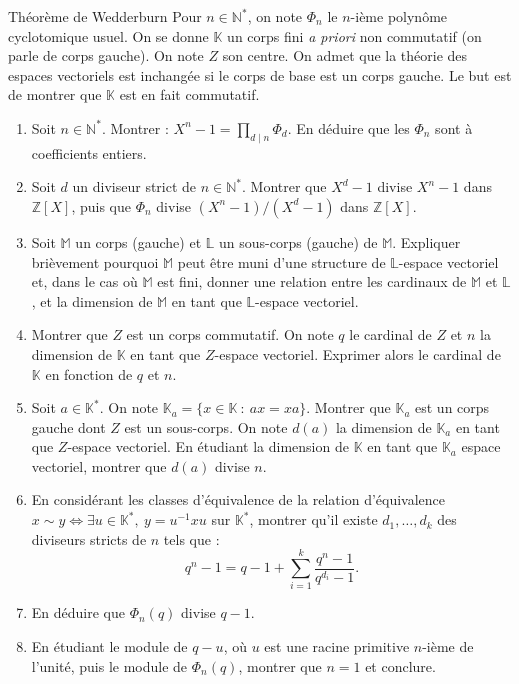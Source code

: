 \documentclass[french]{book}
\newcommand{\N}{\mathbb{N}}
\newcommand{\Z}{\mathbb{Z}}
\newcommand{\K}{\mathbb{K}}
\renewcommand{\L}{\mathbb{L}}
\newcommand{\st}{^*}
\newcommand{\inv}{^{-1}}
\theoremstyle{definition}
\theoremstyle{remark}
\begin{document}
\begin{exo}[3]{Théorème de Wedderburn}
	Pour $n\in\N\st$, on note $\Phi_n$ le $n$-ième polynôme cyclotomique usuel. On se donne $\K$ un corps fini \textit{a priori} non commutatif (on parle de corps gauche). On note $Z$ son centre. On admet que la théorie des espaces vectoriels est inchangée si le corps de base est un corps gauche. Le but est de montrer que $\K$ est en fait commutatif.
	\begin{enumerate}
		\item Soit $n\in\N\st$. Montrer : $X^n-1=\displaystyle\prod_{d\mid n}\Phi_d$. En déduire que les $\Phi_n$ sont à coefficients entiers.
		\item Soit $d$ un diviseur strict de $n\in\N\st$. Montrer que $X^d-1$ divise $X^n-1$ dans $\Z[X]$, puis que $\Phi_n$ divise $(X^n-1)/(X^d-1)$ dans $\Z[X]$.
		\item Soit $\mathbb{M}$ un corps (gauche) et $\L$ un sous-corps (gauche) de $\mathbb{M}$. Expliquer brièvement pourquoi $\mathbb{M}$ peut être muni d'une structure de $\L$-espace vectoriel et, dans le cas où $\mathbb{M}$ est fini, donner une relation entre les cardinaux de $\mathbb{M}$ et $\L$, et la dimension de $\mathbb{M}$ en tant que $\L$-espace vectoriel.
		\item Montrer que $Z$ est un corps commutatif. On note $q$ le cardinal de $Z$ et $n$ la dimension de $\K$ en tant que $Z$-espace vectoriel. Exprimer alors le cardinal de $\K$ en fonction de $q$ et $n$.
		\item Soit $a\in\K\st$. On note $\K_a=\{x\in\K\ :\ ax=xa\}$. Montrer que $\K_a$ est un corps gauche dont $Z$ est un sous-corps. On note $d(a)$ la dimension de $\K_a$ en tant que $Z$-espace vectoriel. En étudiant la dimension de $\K$ en tant que $\K_a$ espace vectoriel, montrer que $d(a)$ divise $n$.
		\item En considérant les classes d'équivalence de la relation d'équivalence $x\sim y\iff\exists u\in\K\st,\ y=u\inv xu$ sur $\K\st$, montrer qu'il existe $d_1,\ldots,d_k$ des diviseurs stricts de $n$ tels que :
		$$q^n-1=q-1+\sum_{i=1}^{k}\frac{q^n-1}{q^{d_i}-1}.$$
		\item En déduire que $\Phi_n(q)$ divise $q-1$.
		\item En étudiant le module de $q-u$, où $u$ est une racine primitive $n$-ième de l'unité, puis le module de $\Phi_n(q)$, montrer que $n=1$ et conclure.
	\end{enumerate}
\end{exo}
\end{document}
